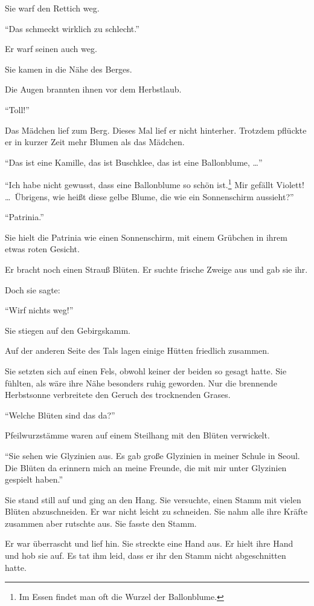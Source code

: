\documentclass[prd,12pt,tightenlines,notitlepage,nofootinbib]{revtex4-1}
\begin{document}
Sie warf den Rettich weg.

"`Das schmeckt wirklich zu schlecht."'

Er warf seinen auch weg.

Sie kamen in die Nähe des Berges.

Die Augen brannten ihnen vor dem Herbstlaub.

"`Toll!"'

Das Mädchen lief zum Berg.  Dieses Mal lief er nicht hinterher.
Trotzdem pflückte er in kurzer Zeit mehr Blumen als das Mädchen.

"`Das ist eine Kamille, das ist Buschklee, das ist eine Ballonblume, \ldots"'

"`Ich habe nicht gewusst, dass eine Ballonblume so schön ist.\footnote{
Im Essen findet man oft die Wurzel der Ballonblume.}
Mir gefällt
Violett!  \ldots\  Übrigens, wie heißt diese gelbe Blume, die wie ein
Sonnenschirm aussieht?"'

"`Patrinia."'

Sie hielt die Patrinia wie einen
Sonnenschirm, mit einem Grübchen in ihrem etwas roten Gesicht.

Er bracht noch einen Strauß Blüten.  Er suchte frische Zweige aus und
gab sie ihr.

Doch sie sagte:

"`Wirf nichts weg!"'

Sie stiegen auf den Gebirgskamm.

Auf der anderen Seite des Tals lagen einige Hütten
friedlich zusammen.

Sie setzten sich auf einen Fels, obwohl keiner der beiden
so gesagt hatte.
Sie fühlten, als wäre ihre Nähe besonders ruhig geworden.
Nur die
brennende Herbstsonne verbreitete den Geruch des trocknenden Grases.

"`Welche Blüten sind das da?"'

Pfeilwurzstämme waren auf einem
Steilhang mit den Blüten verwickelt.

"`Sie sehen wie Glyzinien aus.
Es gab große Glyzinien in meiner Schule in Seoul.  Die Blüten da
erinnern mich an meine Freunde, die mit mir unter Glyzinien gespielt
haben."'

Sie stand still auf und ging an den Hang.  Sie versuchte,
einen Stamm mit vielen Blüten abzuschneiden.  Er war nicht leicht
zu schneiden.  Sie nahm alle ihre Kräfte zusammen aber rutschte aus.
Sie fasste den Stamm.

Er war überrascht und lief hin.  Sie streckte
eine Hand aus.  Er hielt ihre Hand und hob sie auf.  Es tat ihm leid,
dass er ihr den Stamm nicht abgeschnitten hatte.
\end{document}
